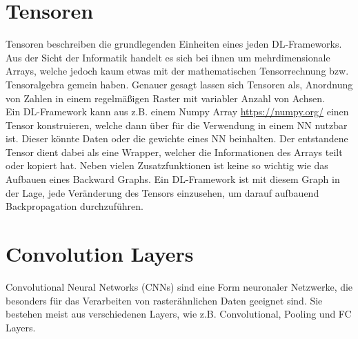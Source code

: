 \section{Tensoren}
Tensoren beschreiben die grundlegenden Einheiten eines jeden DL-Frameworks. Aus der Sicht der Informatik handelt es sich bei ihnen um mehrdimensionale Arrays, welche jedoch kaum etwas mit der mathematischen Tensorrechnung bzw. Tensoralgebra gemein haben. \cite[S. 67]{DRL_Lapan}
Genauer gesagt lassen sich Tensoren als, Anordnung von Zahlen in einem regelmäßigen Raster mit variabler Anzahl von Achsen. \cite[S. 35]{DL}\\
Ein DL-Framework kann aus z.B. einem Numpy Array \url{https://numpy.org/} einen Tensor konstruieren, welche dann über für die Verwendung in einem NN nutzbar ist. Dieser könnte Daten oder die gewichte eines NN beinhalten. Der entstandene Tensor dient dabei als eine Wrapper, welcher die Informationen des Arrays teilt oder kopiert hat. Neben vielen Zusatzfunktionen ist keine so wichtig wie das Aufbauen eines Backward Graphs. Ein DL-Framework ist mit diesem Graph in der Lage, jede Veränderung des Tensors einzusehen, um darauf aufbauend Backpropagation durchzuführen. \cite[S. 72 ff.]{DRL_Lapan}

\section{Convolution Layers}
Convolutional Neural Networks (CNNs) sind eine Form neuronaler Netzwerke, die besonders für das Verarbeiten von rasterähnlichen Daten geeignet sind. Sie bestehen meist aus verschiedenen Layers, wie z.B. Convolutional, Pooling und FC Layers.

